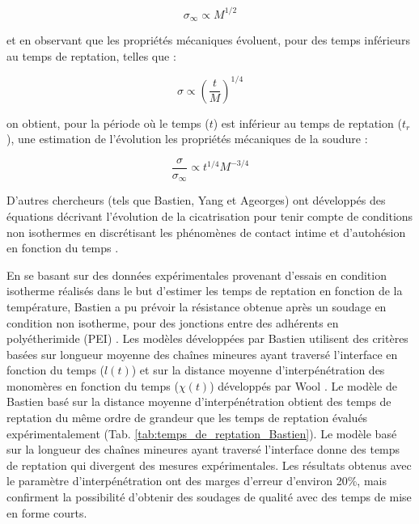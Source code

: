\begin{equation}
\sigma_{\infty} \propto M^{1/2}
\end{equation}

et en observant que les propriétés mécaniques évoluent, pour des temps inférieurs au temps de reptation, telles que \cite{Wool1983} :

\begin{equation}
\sigma \propto \left( \frac{t}{M} \right) ^{1/4}
\end{equation}

on obtient, pour la période où le temps ($t$) est inférieur au temps de reptation ($t_r$), une estimation de l'évolution les propriétés mécaniques de la soudure \cite{Wool1983} : 

\begin{equation}
\frac{\sigma}{\sigma_{\infty}} \propto t^{1/4} M^{-3/4}
\end{equation}

D'autres chercheurs (tels que Bastien, Yang et Ageorges) ont développés des équations décrivant l'évolution de la cicatrisation pour tenir compte de conditions non isothermes en discrétisant les phénomènes de contact intime et d'autohésion en fonction du temps  \cite{Bastien1991,F.Yang2002,Ageorges1998}. 

En se basant sur des données expérimentales provenant d'essais en condition isotherme réalisés dans le but d'estimer les temps de reptation en fonction de la température, Bastien a pu prévoir la résistance obtenue après un soudage en condition non isotherme, pour des jonctions entre des adhérents en polyétherimide (PEI) \cite{Bastien1991}. 
Les modèles développées par Bastien utilisent des critères basées sur longueur moyenne des chaînes mineures ayant traversé l'interface en fonction du temps ($l(t)$) et sur la distance moyenne d'interpénétration des monomères en fonction du temps ($\chi(t)$) développés par Wool \cite{Wool1983}. 
Le modèle de Bastien basé sur la distance moyenne d'interpénétration obtient des temps de reptation du même ordre de grandeur que les temps de reptation évalués expérimentalement (Tab. \ref{tab:temps_de_reptation_Bastien}). 
Le modèle basé sur la longueur des chaînes mineures ayant traversé l'interface donne des temps de reptation qui divergent des mesures expérimentales. 
Les résultats obtenus avec le paramètre d'interpénétration ont des marges d'erreur d'environ 20\%, mais confirment la possibilité d'obtenir des soudages de qualité avec des temps de mise en forme courts.

